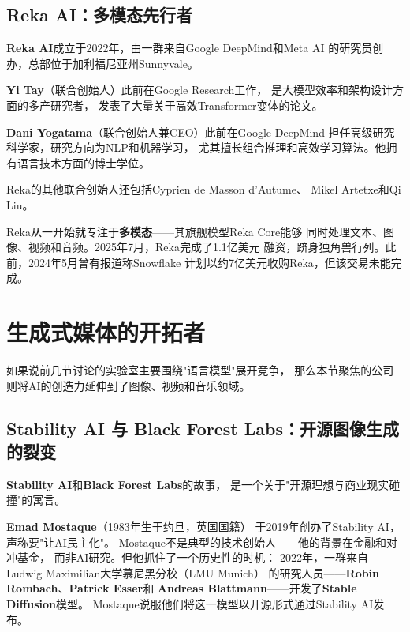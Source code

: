 \subsection{Reka AI：多模态先行者}

\textbf{Reka AI}成立于2022年，由一群来自Google DeepMind和Meta AI
的研究员创办，总部位于加利福尼亚州Sunnyvale。

\textbf{Yi Tay}（联合创始人）此前在Google Research工作，
是大模型效率和架构设计方面的多产研究者，
发表了大量关于高效Transformer变体的论文。

\textbf{Dani Yogatama}（联合创始人兼CEO）此前在Google DeepMind
担任高级研究科学家，研究方向为NLP和机器学习，
尤其擅长组合推理和高效学习算法。他拥有语言技术方面的博士学位。

Reka的其他联合创始人还包括Cyprien de Masson d'Autume、
Mikel Artetxe和Qi Liu。

Reka从一开始就专注于\textbf{多模态}——其旗舰模型Reka Core能够
同时处理文本、图像、视频和音频。2025年7月，Reka完成了1.1亿美元
融资，跻身独角兽行列。此前，2024年5月曾有报道称Snowflake
计划以约7亿美元收购Reka，但该交易未能完成。


\section{生成式媒体的开拓者}
\label{sec:generative-media}

如果说前几节讨论的实验室主要围绕"语言模型"展开竞争，
那么本节聚焦的公司则将AI的创造力延伸到了图像、视频和音乐领域。

\subsection{Stability AI 与 Black Forest Labs：开源图像生成的裂变}

\textbf{Stability AI}和\textbf{Black Forest Labs}的故事，
是一个关于"开源理想与商业现实碰撞"的寓言。

\textbf{Emad Mostaque}（1983年生于约旦，英国国籍）
于2019年创办了Stability AI，声称要"让AI民主化"。
Mostaque不是典型的技术创始人——他的背景在金融和对冲基金，
而非AI研究。但他抓住了一个历史性的时机：
2022年，一群来自Ludwig Maximilian大学慕尼黑分校（LMU Munich）
的研究人员——\textbf{Robin Rombach}、\textbf{Patrick Esser}和
\textbf{Andreas Blattmann}——开发了\textbf{Stable Diffusion}模型。
Mostaque说服他们将这一模型以开源形式通过Stability AI发布。

